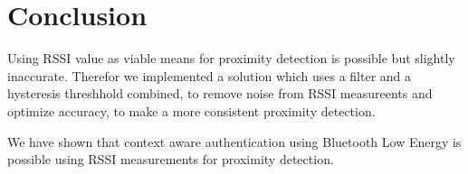 \section{Conclusion}
Using RSSI value as viable means for proximity detection is possible but slightly inaccurate. Therefor we implemented a solution which uses a filter and a hysteresis threshhold combined, to remove noise from RSSI measureents and optimize accuracy, to make a more consistent proximity detection.

%

We have shown that context aware authentication using Bluetooth Low Energy is possible using RSSI measurements for proximity detection.
